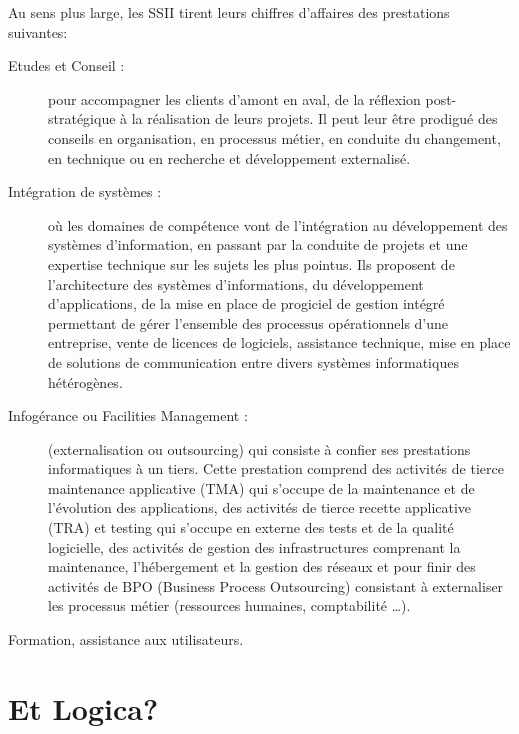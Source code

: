 Au sens plus large, les SSII tirent leurs chiffres d’affaires des prestations suivantes:
\begin{description}
\item[Etudes et Conseil :]pour accompagner les clients d’amont en aval, de la réflexion post-stratégique à la réalisation de leurs projets. Il peut leur être prodigué des conseils en organisation, en processus métier, en conduite du changement, en technique ou en recherche et développement externalisé.

\item[Intégration de systèmes :]où les domaines de compétence vont de l’intégration au développement des systèmes d’information, en passant par la conduite de projets et une expertise technique sur les sujets les plus pointus. Ils proposent de l’architecture des systèmes d’informations, du développement d’applications, de la mise en place de progiciel de gestion intégré permettant de gérer l’ensemble des processus opérationnels d’une entreprise,  vente de licences de logiciels, assistance technique, mise en place de solutions de communication entre divers systèmes informatiques hétérogènes.

\item[Infogérance ou Facilities Management :](externalisation ou outsourcing) qui consiste à confier ses prestations informatiques à un tiers. Cette prestation comprend des activités de tierce maintenance applicative (TMA) qui s’occupe de la maintenance et de l’évolution des applications, des activités de tierce recette applicative (TRA) et testing qui s’occupe en externe des tests et de la qualité logicielle, des activités de gestion des infrastructures comprenant la maintenance, l’hébergement et la gestion des réseaux et pour finir des activités de BPO (Business Process Outsourcing) consistant à externaliser les processus métier (ressources humaines, comptabilité …).

\item[Formation, assistance aux utilisateurs.]
\end{description}

\section{Et Logica?}

